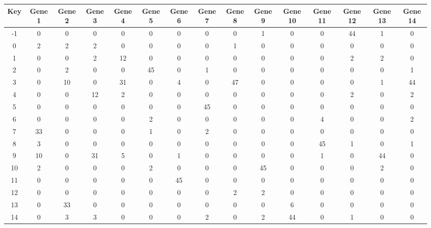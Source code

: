 \begin{tabular}{|c|c|c|c|c|c|c|c|c|c|c|c|c|c|c|}
\hline
Key & Gene 1 & Gene 2 & Gene 3 & Gene 4 & Gene 5 & Gene 6 & Gene 7 & Gene 8 & Gene 9 & Gene 10 & Gene 11 & Gene 12 & Gene 13 & Gene 14 \\
\hline
-1 & 0 & 0 & 0 & 0 & 0 & 0 & 0 & 0 & 1 & 0 & 0 & 44 & 1 & 0 \\
0 & 2 & 2 & 2 & 0 & 0 & 0 & 0 & 1 & 0 & 0 & 0 & 0 & 0 & 0 \\
1 & 0 & 0 & 2 & 12 & 0 & 0 & 0 & 0 & 0 & 0 & 0 & 2 & 2 & 0 \\
2 & 0 & 2 & 0 & 0 & 45 & 0 & 1 & 0 & 0 & 0 & 0 & 0 & 0 & 1 \\
3 & 0 & 10 & 0 & 31 & 0 & 4 & 0 & 47 & 0 & 0 & 0 & 0 & 1 & 44 \\
4 & 0 & 0 & 12 & 2 & 0 & 0 & 0 & 0 & 0 & 0 & 0 & 2 & 0 & 2 \\
5 & 0 & 0 & 0 & 0 & 0 & 0 & 45 & 0 & 0 & 0 & 0 & 0 & 0 & 0 \\
6 & 0 & 0 & 0 & 0 & 2 & 0 & 0 & 0 & 0 & 0 & 4 & 0 & 0 & 2 \\
7 & 33 & 0 & 0 & 0 & 1 & 0 & 2 & 0 & 0 & 0 & 0 & 0 & 0 & 0 \\
8 & 3 & 0 & 0 & 0 & 0 & 0 & 0 & 0 & 0 & 0 & 45 & 1 & 0 & 1 \\
9 & 10 & 0 & 31 & 5 & 0 & 1 & 0 & 0 & 0 & 0 & 1 & 0 & 44 & 0 \\
10 & 2 & 0 & 0 & 0 & 2 & 0 & 0 & 0 & 45 & 0 & 0 & 0 & 2 & 0 \\
11 & 0 & 0 & 0 & 0 & 0 & 45 & 0 & 0 & 0 & 0 & 0 & 0 & 0 & 0 \\
12 & 0 & 0 & 0 & 0 & 0 & 0 & 0 & 2 & 2 & 0 & 0 & 0 & 0 & 0 \\
13 & 0 & 33 & 0 & 0 & 0 & 0 & 0 & 0 & 0 & 6 & 0 & 0 & 0 & 0 \\
14 & 0 & 3 & 3 & 0 & 0 & 0 & 2 & 0 & 2 & 44 & 0 & 1 & 0 & 0 \\
\hline
\end{tabular}